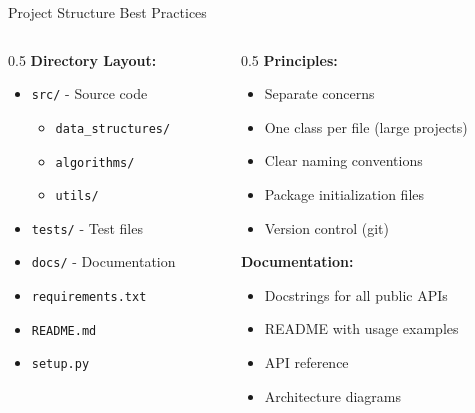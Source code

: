 \documentclass[aspectratio=169,xcolor=dvipsnames]{beamer}
\begin{document}
\begin{frame}{Project Structure Best Practices}
  \begin{columns}
    \begin{column}{0.5\textwidth}
      \textbf{Directory Layout:}
      \begin{itemize}
        \item \texttt{src/} - Source code
        \begin{itemize}
          \item \texttt{data\_structures/}
          \item \texttt{algorithms/}
          \item \texttt{utils/}
        \end{itemize}
        \item \texttt{tests/} - Test files
        \item \texttt{docs/} - Documentation
        \item \texttt{requirements.txt}
        \item \texttt{README.md}
        \item \texttt{setup.py}
      \end{itemize}
    \end{column}

    \begin{column}{0.5\textwidth}
      \textbf{Principles:}
      \begin{itemize}
        \item Separate concerns
        \item One class per file (large projects)
        \item Clear naming conventions
        \item Package initialization files
        \item Version control (git)
      \end{itemize}

      \vspace{0.3cm}
      \textbf{Documentation:}
      \begin{itemize}
        \item Docstrings for all public APIs
        \item README with usage examples
        \item API reference
        \item Architecture diagrams
      \end{itemize}
    \end{column}
  \end{columns}
\end{frame}
\end{document}
